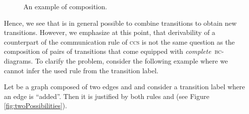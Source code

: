 \begin{figure}[htb]
  \caption{An example of composition.}
  \label{fig:compo}
 \end{figure}
Hence, 
we see that is in general possible to combine  transitions to obtain new transitions. 
However, 
we emphasize at this point, 
that derivability of a counterpart of the communication rule of \textsc{ccs}
is not the same question as the composition 
of pairs of transitions that come equipped with \emph{complete}~\textsc{bc}-diagrams. 
To clarify the problem, 
consider the following example where we cannot  infer the used rule from the 
transition label. 


\begin{example}
  Let  be a graph composed of two edges  and  and consider a transition label where an edge  is ``added''. 
  Then it is justified by both rules  and  (see Figure \ref{fig:twoPossibilities}). 
\end{example}

